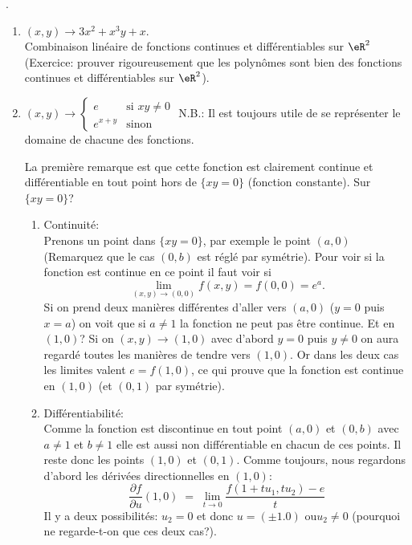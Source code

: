 .
\begin{enumerate}
\item $(x,y)\rightarrow  3x^2+x^3y+x$.\\
Combinaison linéaire de fonctions continues et différentiables sur $\eR^2$ (Exercice: prouver rigoureusement que les polynômes sont bien des fonctions continues et différentiables sur $\eR^2$).


\item \(  (x,y)\rightarrow\begin{cases}
        e    &   \text{si } xy\neq 0\\
        e^{x+y}    &    \text{sinon}
    \end{cases}\)
N.B.: Il est toujours utile de se représenter le domaine de chacune des fonctions.

\noindent La première remarque est que cette fonction est clairement continue et différentiable en tout point hors de $\{xy=0\}$ (fonction constante). Sur $\{xy=0\}$?
\begin{enumerate}
\item Continuité:\\
Prenons un point dans $\{xy=0\}$, par exemple le point $(a,0)$ (Remarquez que le cas $(0,b)$ est réglé par symétrie). Pour voir si la fonction est continue en ce point il faut voir si \[\lim_{(x,y)\rightarrow (0,0)}f(x,y)=f(0,0)=e^a.\] Si on prend deux manières différentes d'aller vers $(a,0)$ ($y=0$ puis $x=a$) on voit que si $a \neq1$ la fonction ne peut pas être continue. Et en $(1,0)$? Si on $(x,y)\rightarrow (1,0)$ avec d'abord $y=0$ puis $y\neq0$ on aura regardé toutes les manières de tendre vers $(1,0)$. Or dans les deux cas les limites valent $e = f(1,0)$, ce qui prouve que la fonction est continue en $(1,0)$ (et $(0,1)$ par symétrie).

\item Différentiabilité:\\
Comme la fonction est discontinue en tout point $(a,0)$ et $(0,b)$ avec $a\neq1$ et $b\neq1$ elle est aussi non différentiable en chacun de ces points. Il reste donc les points $(1,0)$ et $(0,1)$. Comme toujours, nous regardons d'abord les dérivées directionnelles en $(1,0)$:
\[\frac{ \partial f }{ \partial u }(1,0) \;=\;\lim_{t\rightarrow 0}\frac{f(1+tu_1,tu_2)-e}{t}\]
Il y a deux possibilités: $u_2=0$ et donc $u=(\pm1.0)$ ou$u_2\neq0$ (pourquoi ne regarde-t-on que ces deux cas?).


\end{enumerate}
\end{enumerate}
